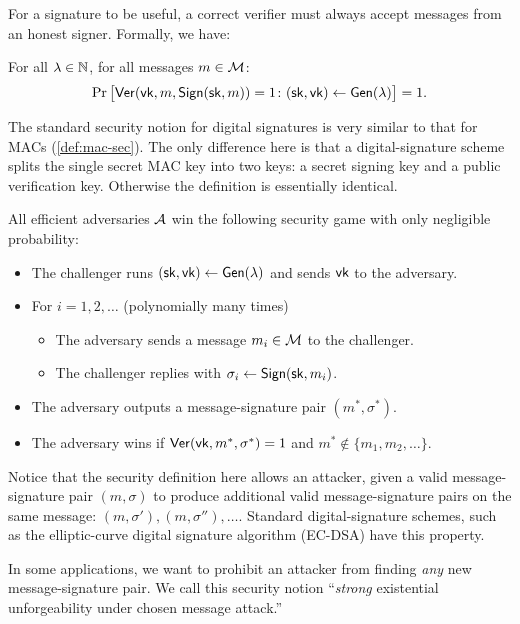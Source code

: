 For a signature to be useful, a correct verifier must always accept messages from an
honest signer. Formally, we have:

\begin{definition}
  For all $\lambda \in \mathbb{N}$, for all messages $m \in \mathcal{M}$:
  \[ \Pr\big[\mathsf{Ver}(\mathsf{vk}, m, \mathsf{Sign}({\mathsf{sk}}, m)) = 1 \colon ({\mathsf{sk}}, \mathsf{vk}) \gets \mathsf{Gen}(\lambda) \big] = 1. \]
\end{definition}

The standard security notion for digital signatures is very similar
to that for MACs (\cref{def:mac-sec}).
The only difference here is that a digital-signature scheme splits the single
secret MAC key into two keys: a secret signing key and a public verification key.
Otherwise the definition is essentially identical.

\begin{definition}\label{def:sig-sec}
  All efficient adversaries $\mathcal{A}$ win the following security 
  game with only negligible probability:
  \begin{itemize}[noitemsep]
    \item The challenger runs $({\mathsf{sk}}, \mathsf{vk}) \gets \mathsf{Gen}(\lambda)$ and sends $\mathsf{vk}$ to the adversary.
    \item For $i = 1, 2, \dots$  (polynomially many times)
      \begin{itemize}
        \item The adversary sends a message $m_i \in \mathcal{M}$ to the challenger.
        \item The challenger replies with $\sigma_i \gets \mathsf{Sign}({\mathsf{sk}}, m_i)$.
      \end{itemize}
    \item The adversary outputs a message-signature pair $(m^*, \sigma^*)$.
    \item The adversary wins if $\mathsf{Ver}(\mathsf{vk}, m^*, \sigma^*) = 1$ and $m^* \not \in \{m_1, m_2, \dots\}$.
  \end{itemize}
\end{definition}

Notice that the security definition here allows an attacker, given a valid
message-signature pair $(m, \sigma)$ to produce additional valid message-signature
pairs on the same message: $(m, \sigma'), (m, \sigma''), \dots$.
Standard digital-signature schemes, such as the elliptic-curve digital signature
algorithm (EC-DSA) have this property.

In some applications, we want to prohibit an attacker from finding \emph{any}
new message-signature pair. We call this security notion ``\emph{strong} existential unforgeability under chosen message attack.'' 

